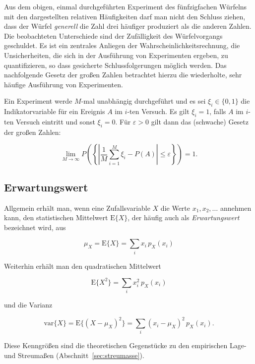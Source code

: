 \begin{bemerkung}
Aus dem obigen, einmal durchgeführten Experiment des fünfzigfachen Würfelns mit den dargestellten relativen Häufigkeiten darf man nicht den Schluss ziehen, dass der Würfel \textit{generell} die Zahl drei häufiger produziert als die anderen Zahlen. Die beobachteten Unterschiede sind der Zufälligkeit des Würfelvorgangs geschuldet. Es ist ein zentrales Anliegen der Wahrscheinlichkeitsrechnung, die Unsicherheiten, die sich in der Ausführung von Experimenten ergeben, zu quantifizieren, so dass gesicherte Schlussfolgerungen möglich werden. Das nachfolgende Gesetz der großen Zahlen betrachtet hierzu die wiederholte, sehr häufige Ausführung von Experimenten.
\end{bemerkung}

Ein Experiment werde $M$-mal unabhängig durchgeführt und es sei $\xi_i \in \{0,1\}$ die Indikatorvariable für ein Ereignis $A$ im $i$-ten Versuch. Es gilt $\xi_i = 1$, falls $A$ im $i$-ten Versuch eintritt und sonst $\xi_i = 0$. Für $\varepsilon > 0$ gilt dann das (schwache) Gesetz der großen Zahlen:

$$
\lim_{M \to \infty} P\!\left(\left\{\left|\frac{1}{M}\sum_{i=1}^{M} \xi_i - P(A)\right| \leq \varepsilon\right\}\right) = 1.
$$

\subsection{Erwartungswert}
\label{sec:erwartungswert}

\begin{definition}
Allgemein erhält man, wenn eine Zufallsvariable $X$ die Werte $x_1, x_2, \ldots$ annehmen kann, den statistischen Mittelwert $\mathrm{E}\{X\}$, der häufig auch als \textit{Erwartungswert} bezeichnet wird, aus

$$
\mu_X = \mathrm{E}\{X\} = \sum_i x_i\, p_X(x_i)
$$

Weiterhin erhält man den quadratischen Mittelwert

$$
\mathrm{E}\{X^2\} = \sum_i x_i^2\, p_X(x_i)
$$

und die Varianz

$$
\mathrm{var}\{X\} = \mathrm{E}\{(X - \mu_X)^2\} = \sum_i (x_i - \mu_X)^2\, p_X(x_i).
$$
\end{definition}

Diese Kenngrößen sind die theoretischen Gegenstücke zu den empirischen Lage- und Streumaßen (Abschnitt~\ref{sec:streumasse}).

